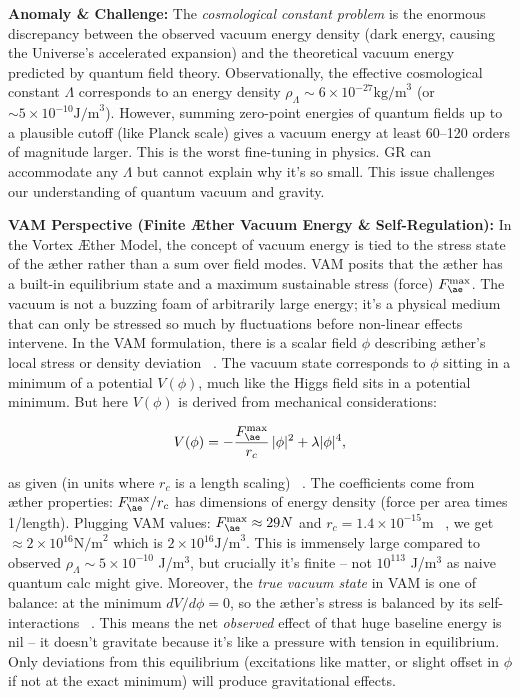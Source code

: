 \documentclass[a4paper, aps,preprint,superscriptaddress, 12pt]{revtex4}
\begin{document}
\textbf{Anomaly \& Challenge: } The \textit{cosmological constant problem} is the enormous discrepancy between the observed vacuum energy density (dark energy, causing the Universe's accelerated expansion) and the theoretical vacuum energy predicted by quantum field theory. Observationally, the effective cosmological constant $\Lambda$ corresponds to an energy density $\rho_{\Lambda}\sim 6\times10^{-27}\text{kg/m}^3$ (or $\sim 5\times10^{-10}\text{J/m}^3$). However, summing zero-point energies of quantum fields up to a plausible cutoff (like Planck scale) gives a vacuum energy at least 60–120 orders of magnitude larger. This is the worst fine-tuning in physics. GR can accommodate any $\Lambda$ but cannot explain why it's so small. This issue challenges our understanding of quantum vacuum and gravity.


\textbf{VAM Perspective (Finite Æther Vacuum Energy \& Self-Regulation):} In the Vortex Æther Model, the concept of vacuum energy is tied to the stress state of the æther rather than a sum over field modes. VAM posits that the æther has a built-in equilibrium state and a maximum sustainable stress (force) $F_{\ae}^{\max}$. The vacuum is not a buzzing foam of arbitrarily large energy; it's a physical medium that can only be stressed so much by fluctuations before non-linear effects intervene. In the VAM formulation, there is a scalar field $\phi$ describing æther's local stress or density deviation~\cite{Iskandarani2025c} . The vacuum state corresponds to $\phi$ sitting in a minimum of a potential $V(\phi)$, much like the Higgs field sits in a potential minimum. But here $V(\phi)$ is derived from mechanical considerations:

\begin{equation}
    V(\phi) = -\frac{F_{\ae}^{\max}}{r_c}\,|\phi|^2 + \lambda |\phi|^4,
\end{equation}

as given (in units where $r_c$ is a length scaling)~\cite{Iskandarani2025c} . The coefficients come from æther properties: $F_{\ae}^{\max}/r_c$ has dimensions of energy density (force per area times 1/length). Plugging VAM values: $F_{\ae}^{\max}\approx 29N$ and $r_c=1.4\times10^{-15}\text{m}$~\cite{VAM_constants} , we get $\approx 2\times10^{16}\text{N/m}^2$ which is $2\times10^{16}\text{J/m}^3$. This is immensely large compared to observed $\rho_\Lambda\sim5\times10^{-10}$ J/m$^3$, but crucially it's finite – not $10^{113}$ J/m$^3$ as naive quantum calc might give. Moreover, the \textit{true vacuum state} in VAM is one of balance: at the minimum $dV/d\phi=0$, so the æther's stress is balanced by its self-interactions~\cite{Iskandarani2025c} . This means the net \textit{observed} effect of that huge baseline energy is nil – it doesn't gravitate because it's like a pressure with tension in equilibrium. Only deviations from this equilibrium (excitations like matter, or slight offset in $\phi$ if not at the exact minimum) will produce gravitational effects.
\end{document}

